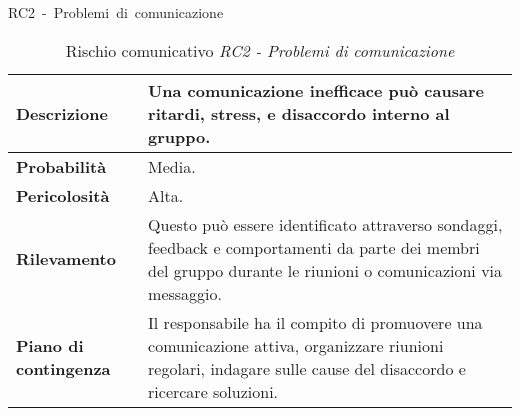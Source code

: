 \begin{table}[!h]
    \centering
    \hbox{RC2 - Problemi di comunicazione }
    \vspace{0.3cm}
	\begin{tabular}{|l|p{10cm}|} 
		\hline
		\textbf{Descrizione} & Una comunicazione inefficace può causare ritardi, stress, e disaccordo interno al gruppo.  \\ 
        \hline
        \textbf{Probabilità} & Media. \\
        \hline
        \textbf{Pericolosità} & Alta. \\
        \hline
        \textbf{Rilevamento} & Questo può essere identificato attraverso sondaggi, feedback e comportamenti da parte dei membri del gruppo durante le riunioni o comunicazioni via messaggio. \\
        \hline
        \textbf{Piano di contingenza} & Il responsabile ha il compito di promuovere una comunicazione attiva, organizzare riunioni regolari, indagare sulle cause del disaccordo e ricercare soluzioni. \\
		\hline
	\end{tabular}
    \caption{Rischio comunicativo \textit{RC2 - Problemi di comunicazione}}
    \label{table:9}
\end{table}